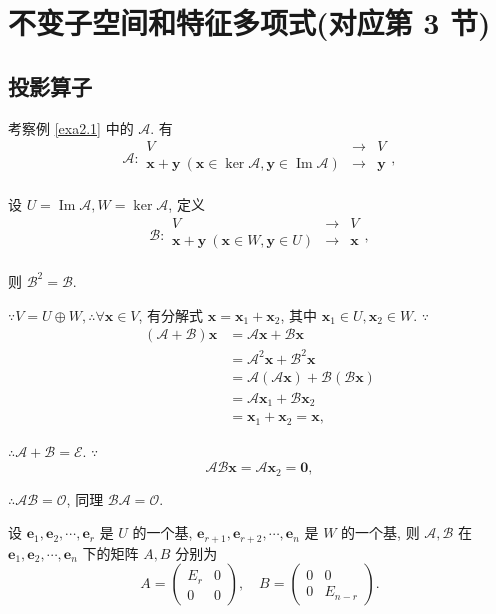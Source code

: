 \documentclass{ctexart}
\begin{document}
\section{不变子空间和特征多项式(对应第 3 节)}
\subsection{投影算子}
考察例 \ref{exa2.1} 中的 $\mathcal{A}$. 有
\[\mathcal{A}:\begin{array}{rcl}
    V & \to & V \\
    \boldsymbol{x}+\boldsymbol{y}\ (\boldsymbol{x}\in\ker\mathcal{A},\boldsymbol{y}\in\operatorname{Im}\mathcal{A}) & \to & \boldsymbol{y} \\
\end{array},\]

设 $U=\operatorname{Im}\mathcal{A},W=\ker\mathcal{A}$, 定义
\[\mathcal{B}:\begin{array}{rcl}
    V & \to & V \\
    \boldsymbol{x}+\boldsymbol{y}\ (\boldsymbol{x}\in W,\boldsymbol{y}\in U) & \to & \boldsymbol{x} \\
\end{array},\]

则 $\mathcal{B}^2=\mathcal{B}$.

$\because V=U\oplus W,\therefore\forall\boldsymbol{x}\in V$, 有分解式 $\boldsymbol{x}=\boldsymbol{x}_1+\boldsymbol{x}_2$, 其中 $\boldsymbol{x}_1\in U,\boldsymbol{x}_2\in W$. $\because$
\begin{align*}
    (\mathcal{A}+\mathcal{B})\boldsymbol{x} & =\mathcal{A}\boldsymbol{x}+\mathcal{B}\boldsymbol{x} \\
    & =\mathcal{A}^2\boldsymbol{x}+\mathcal{B}^2\boldsymbol{x} \\
    & =\mathcal{A}(\mathcal{A}\boldsymbol{x})+\mathcal{B}(\mathcal{B}\boldsymbol{x}) \\
    & =\mathcal{A}\boldsymbol{x}_1+\mathcal{B}\boldsymbol{x}_2 \\
    & =\boldsymbol{x}_1+\boldsymbol{x}_2=\boldsymbol{x},
\end{align*}

$\therefore\mathcal{A}+\mathcal{B}=\mathcal{E}$. $\because$
\[\mathcal{A}\mathcal{B}\boldsymbol{x}=\mathcal{A}\boldsymbol{x}_2=\boldsymbol{0},\]

$\therefore\mathcal{A}\mathcal{B}=\mathcal{O}$, 同理 $\mathcal{B}\mathcal{A}=\mathcal{O}$.

设 $\boldsymbol{e}_1,\boldsymbol{e}_2,\cdots,\boldsymbol{e}_r$ 是 $U$ 的一个基, $\boldsymbol{e}_{r+1},\boldsymbol{e}_{r+2},\cdots,\boldsymbol{e}_n$ 是 $W$ 的一个基, 则 $\mathcal{A},\mathcal{B}$ 在 $\boldsymbol{e}_1,\boldsymbol{e}_2,\cdots,\boldsymbol{e}_n$ 下的矩阵 $A,B$ 分别为
\[A=\begin{pmatrix}
    E_r & 0 \\
    0 & 0
\end{pmatrix},\quad B=\begin{pmatrix}
    0 & 0 \\
    0 & E_{n-r}
\end{pmatrix}.\]
\end{document}
